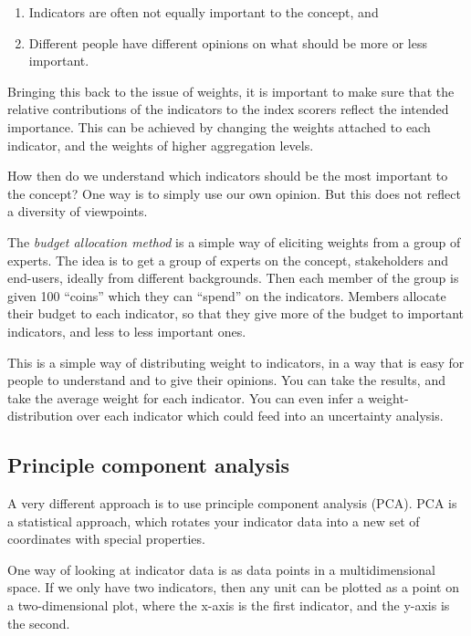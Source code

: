 \documentclass[
]{book}
\providecommand{\tightlist}{%
  \setlength{\itemsep}{0pt}\setlength{\parskip}{0pt}}
\begin{document}
\begin{enumerate}
\def\labelenumi{\arabic{enumi}.}
\tightlist
\item
  Indicators are often not equally important to the concept, and
\item
  Different people have different opinions on what should be more or less important.
\end{enumerate}

Bringing this back to the issue of weights, it is important to make sure that the relative contributions of the indicators to the index scorers reflect the intended importance. This can be achieved by changing the weights attached to each indicator, and the weights of higher aggregation levels.

How then do we understand which indicators should be the most important to the concept? One way is to simply use our own opinion. But this does not reflect a diversity of viewpoints.

The \emph{budget allocation method} is a simple way of eliciting weights from a group of experts. The idea is to get a group of experts on the concept, stakeholders and end-users, ideally from different backgrounds. Then each member of the group is given 100 ``coins'' which they can ``spend'' on the indicators. Members allocate their budget to each indicator, so that they give more of the budget to important indicators, and less to less important ones.

This is a simple way of distributing weight to indicators, in a way that is easy for people to understand and to give their opinions. You can take the results, and take the average weight for each indicator. You can even infer a weight-distribution over each indicator which could feed into an uncertainty analysis.

\hypertarget{principle-component-analysis}{%
\subsection{Principle component analysis}\label{principle-component-analysis}}

A very different approach is to use principle component analysis (PCA). PCA is a statistical approach, which rotates your indicator data into a new set of coordinates with special properties.

One way of looking at indicator data is as data points in a multidimensional space. If we only have two indicators, then any unit can be plotted as a point on a two-dimensional plot, where the x-axis is the first indicator, and the y-axis is the second.
\end{document}

